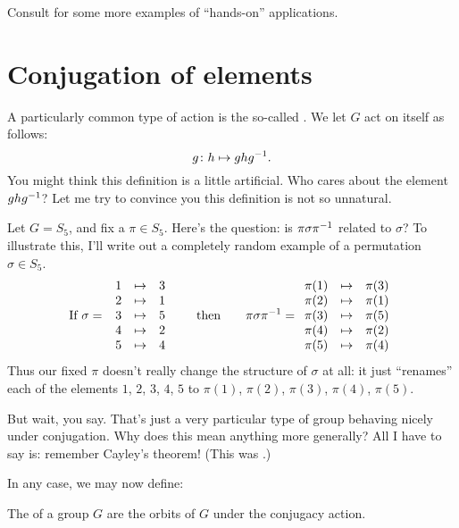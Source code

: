 Consult \cite{ref:aops_burnside}
for some more examples of ``hands-on'' applications.

\section{Conjugation of elements}
A particularly common type of action is the so-called .
We let $G$ act on itself as follows:
\[ g \colon h \mapsto ghg^{-1}. \]
You might think this definition is a little artificial.
Who cares about the element $ghg^{-1}$?
Let me try to convince you this definition is not so unnatural.
\begin{example}
	[Conjugacy in $S_n$]
	Let $G = S_5$, and fix a $\pi \in S_5$.
	Here's the question: is $\pi \sigma \pi ^{-1}$ related to $\sigma$?
	To illustrate this,
	I'll write out a completely random example of a permutation $\sigma \in S_5$.
	\[
		\text{If }
		\sigma = \;
		\begin{array}{ccc}
		1 & \mapsto & 3 \\
		2 & \mapsto & 1 \\
		3 & \mapsto & 5 \\
		4 & \mapsto & 2 \\
		5 & \mapsto & 4
		\end{array}
		\qquad
		\text{then}
		\qquad
		\pi \sigma \pi^{-1} =
		\begin{array}{ccc}
		\pi(1) & \mapsto & \pi(3) \\
		\pi(2) & \mapsto & \pi(1) \\
		\pi(3) & \mapsto & \pi(5) \\
		\pi(4) & \mapsto & \pi(2) \\
		\pi(5) & \mapsto & \pi(4)
		\end{array}
	\]
	Thus our fixed $\pi$ doesn't really change the structure of $\sigma$ at all:
	it just ``renames'' each of the elements $1$, $2$, $3$, $4$, $5$
	to $\pi(1)$, $\pi(2)$, $\pi(3)$, $\pi(4)$, $\pi(5)$.
\end{example}
But wait, you say.
That's just a very particular type of group behaving nicely under conjugation.
Why does this mean anything more generally?
All I have to say is: remember Cayley's theorem!
(This was .)

In any case, we may now define:
\begin{definition}
	The  of a group $G$ are the orbits of $G$ under
	the conjugacy action.
\end{definition}

